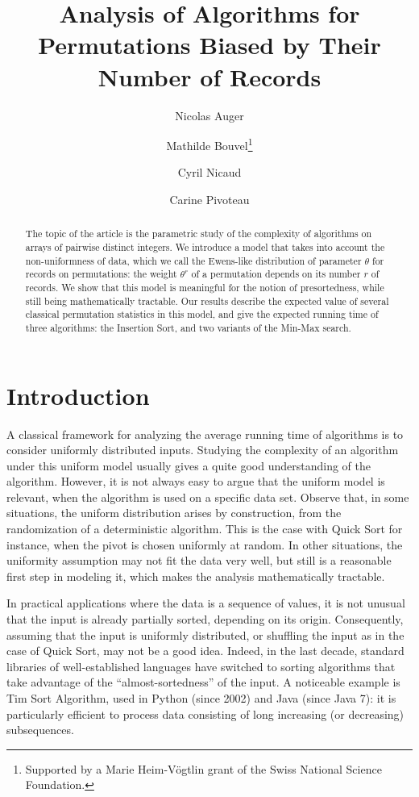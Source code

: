 \documentclass[proceedings]{aofa}
\author{Nicolas Auger\addressmark{1}
  \and Mathilde Bouvel\addressmark{2}\thanks{Supported by a Marie Heim-Vögtlin grant of the Swiss National Science Foundation.}
  \and Cyril Nicaud\addressmark{1}
  \and Carine Pivoteau\addressmark{1}}
\title[Analysis of Algorithms for Biased Permutations]{Analysis of Algorithms for Permutations Biased by Their Number of Records}
\begin{document}
\maketitle
\begin{abstract}
The topic of the article is the parametric study of the complexity of algorithms on arrays of pairwise distinct integers. 
We introduce a model that takes into account the non-uniformness of data, 
which we call the Ewens-like distribution of parameter $\theta$ for records on permutations: 
the weight $\theta^r$ of a permutation depends on its number $r$ of records. 
We show that this model is  meaningful for the notion of presortedness, while still being mathematically tractable.
Our results describe the expected value of several classical permutation statistics in this model, 
and give the expected running time of three algorithms: the Insertion Sort, and two variants of the Min-Max search. 
\end{abstract}




\section{Introduction}\label{sec:intro}
A classical framework for analyzing the average running time of algorithms is to consider uniformly distributed inputs. 
Studying the complexity of an algorithm under this uniform model usually gives a quite good understanding of the algorithm. 
However, it is not always easy to argue that the uniform model is relevant, when the algorithm is used on a specific data set. 
Observe that, in some situations, the uniform distribution arises by construction, from the  randomization of a deterministic algorithm. 
This is the case with Quick Sort for instance, when the pivot is chosen uniformly at random.
In other situations, the uniformity assumption may not fit the data very well, 
but still is a reasonable first step in modeling it, which  makes the analysis mathematically tractable.

In practical applications where the data is a sequence of values, 
it is not unusual that the input is already partially sorted, depending on its origin. 
Consequently, assuming that the input is uniformly distributed, or shuffling the input as in the case of Quick Sort, may not be a good idea.  
Indeed, in the last decade, standard libraries of well-established languages have switched to sorting algorithms that take advantage of the ``almost-sortedness'' of the input. 
A noticeable example is Tim Sort Algorithm, used in Python (since 2002) and Java (since Java 7): it is particularly efficient to process data consisting of long increasing (or decreasing) subsequences.
\end{document}
